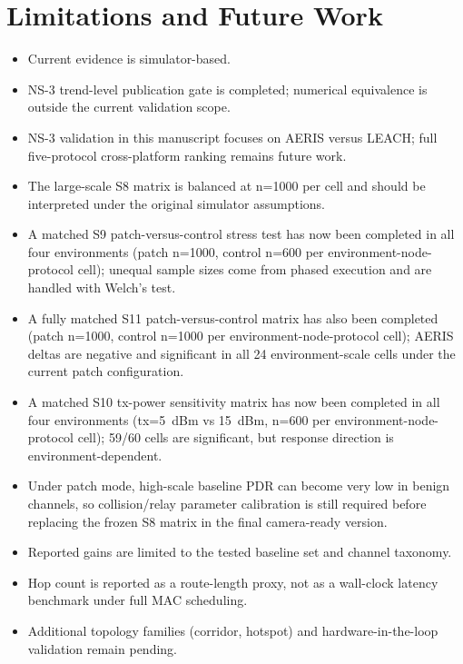 \documentclass[sensors,article,submit,moreauthors,pdftex]{Definitions/mdpi}
\begin{document}
\section{Limitations and Future Work}
\begin{itemize}
\item Current evidence is simulator-based.
\item NS-3 trend-level publication gate is completed; numerical equivalence is outside the current validation scope.
\item NS-3 validation in this manuscript focuses on AERIS versus LEACH; full five-protocol cross-platform ranking remains future work.
\item The large-scale S8 matrix is balanced at n=1000 per cell and should be interpreted under the original simulator assumptions.
\item A matched S9 patch-versus-control stress test has now been completed in all four environments (patch n=1000, control n=600 per environment-node-protocol cell); unequal sample sizes come from phased execution and are handled with Welch's test.
\item A fully matched S11 patch-versus-control matrix has also been completed (patch n=1000, control n=1000 per environment-node-protocol cell); AERIS deltas are negative and significant in all 24 environment-scale cells under the current patch configuration.
\item A matched S10 tx-power sensitivity matrix has now been completed in all four environments (tx=\SI{5}{dBm} vs \SI{15}{dBm}, n=600 per environment-node-protocol cell); 59/60 cells are significant, but response direction is environment-dependent.
\item Under patch mode, high-scale baseline PDR can become very low in benign channels, so collision/relay parameter calibration is still required before replacing the frozen S8 matrix in the final camera-ready version.
\item Reported gains are limited to the tested baseline set and channel taxonomy.
\item Hop count is reported as a route-length proxy, not as a wall-clock latency benchmark under full MAC scheduling.
\item Additional topology families (corridor, hotspot) and hardware-in-the-loop validation remain pending.
\end{itemize}
\end{document}
